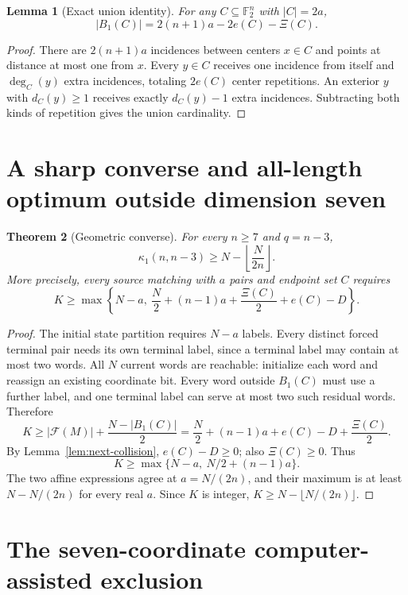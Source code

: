 \documentclass[11pt,a4paper]{article}
\newtheorem{theorem}{Theorem}[section]
\newtheorem{lemma}[theorem]{Lemma}
\newcommand{\F}{\mathbb F_2}
\begin{document}
\begin{lemma}[Exact union identity]\label{lem:union}
For any $C\subseteq\F^n$ with $|C|=2a$,
\[
 \boxed{\quad |B_1(C)|=2(n+1)a-2e(C)-\Xi(C).\quad}
\]
\end{lemma}
\begin{proof}
There are $2(n+1)a$ incidences between centers $x\in C$ and points at distance at most one from $x$. Every $y\in C$ receives one incidence from itself and $\deg_C(y)$ extra incidences, totaling $2e(C)$ center repetitions. An exterior $y$ with $d_C(y)\ge1$ receives exactly $d_C(y)-1$ extra incidences. Subtracting both kinds of repetition gives the union cardinality.
\end{proof}

\section{A sharp converse and all-length optimum outside dimension seven}
\begin{theorem}[Geometric converse]\label{thm:next-converse}
For every $n\ge7$ and $q=n-3$,
\[
 \boxed{\quad \kappa_1(n,n-3)\ge N-\left\lfloor\frac{N}{2n}\right\rfloor.\quad}
\]
More precisely, every source matching with $a$ pairs and endpoint set $C$ requires
\[
 K\ge\max\left\{N-a,\ \frac N2+(n-1)a+\frac{\Xi(C)}2+e(C)-D\right\}.
\]
\end{theorem}
\begin{proof}
The initial state partition requires $N-a$ labels. Every distinct forced terminal pair needs its own terminal label, since a terminal label may contain at most two words. All $N$ current words are reachable: initialize each word and reassign an existing coordinate bit. Every word outside $B_1(C)$ must use a further label, and one terminal label can serve at most two such residual words. Therefore
\[
 K\ge |\mathcal F(M)|+\frac{N-|B_1(C)|}{2}
 =\frac N2+(n-1)a+e(C)-D+\frac{\Xi(C)}2.
\]
By Lemma~\ref{lem:next-collision}, $e(C)-D\ge0$; also $\Xi(C)\ge0$. Thus
\[
 K\ge\max\bigl\{N-a,\ N/2+(n-1)a\bigr\}.
\]
The two affine expressions agree at $a=N/(2n)$, and their maximum is at least $N-N/(2n)$ for every real $a$. Since $K$ is integer, $K\ge N-\lfloor N/(2n)\rfloor$.
\end{proof}




\section{The seven-coordinate computer-assisted exclusion}\label{sec:sevenformal}
\end{document}
